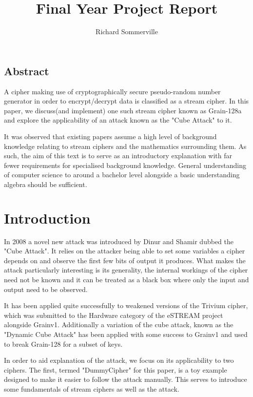 \documentclass{report}
\title{Final Year Project Report}
\author{Richard Sommerville}
\date{}
\let\Oldsection\section
\renewcommand{\section}{\FloatBarrier\Oldsection}
\begin{document}
\maketitle
\tableofcontents
\section{Abstract}
A cipher making use of cryptographically secure pseudo-random number generator in order to encrypt/decrypt data is classified as a stream cipher. In this paper, we discuss(and implement) one such stream cipher known as Grain-128a and explore the applicability of an attack known as the "Cube Attack" to it.

It was observed that existing papers assume a high level of background knowledge relating to stream ciphers and the mathematics surrounding them. As such, the aim of this text is to serve as an introductory explanation with far fewer requirements for specialised background knowledge. General understanding of computer science to around a bachelor level alongside a basic understanding algebra should be sufficient.
\chapter{Introduction}
In 2008 a novel new attack was introduced by Dinur and Shamir\cite{DinurShamir2009} dubbed the "Cube Attack". It relies on the attacker being able to set some variables a cipher depends on and observe the first few bits of output it produces. What makes the attack particularly interesting is its generality, the internal workings of the cipher need not be known and it can be treated as a black box where only the input and output need to be observed.

It has been applied quite successfully to weakened versions of the Trivium cipher\cite{DinurShamir2009}\cite{MobiusTransform}, which was submitted to the Hardware category of the eSTREAM project alongside Grainv1\cite{eStreamPort}. Additionally a variation of the cube attack, known as the "Dynamic Cube Attack" has been applied with some success to Grainv1\cite{cryptoeprint:2010:570} and used to break Grain-128\cite{DynamicCube128} for a subset of keys.

In order to aid explanation of the attack, we focus on its applicability to two ciphers. The first, termed "DummyCipher" for this paper, is a toy example designed to make it easier to follow the attack manually. This serves to introduce some fundamentals of stream ciphers as well as the attack.
\end{document}
